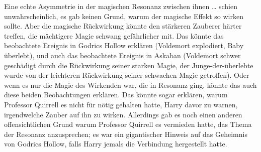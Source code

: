 Eine echte Asymmetrie in der magischen Resonanz zwischen ihnen … schien unwahrscheinlich, es gab keinen Grund, warum der magische Effekt so wirken sollte. Aber die magische Rückwirkung könnte den stärkeren Zauberer härter treffen, die mächtigere Magie schwang gefährlicher mit. Das könnte das beobachtete Ereignis in Godrics Hollow erklären (Voldemort explodiert, Baby überlebt), und auch das beobachtete Ereignis in Askaban (Voldemort schwer geschädigt durch die Rückwirkung seiner starken Magie, der Junge-der-überlebte wurde von der leichteren Rückwirkung seiner schwachen Magie getroffen). Oder wenn es nur die Magie des Wirkenden war, die in Resonanz ging, könnte das auch diese beiden Beobachtungen erklären. Das könnte sogar erklären, warum Professor Quirrell es nicht für nötig gehalten hatte, Harry davor zu warnen, irgendwelche Zauber auf ihn zu wirken. Allerdings gab es noch einen anderen offensichtlichen Grund warum Professor Quirrell es vermieden hatte, das Thema der Resonanz anzusprechen; es war ein gigantischer Hinweis auf das Geheimnis von Godrics Hollow, falls Harry jemals die Verbindung hergestellt hatte.

